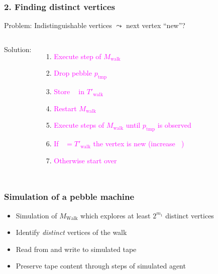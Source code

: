 \documentclass{beamer}
\DeclareMathOperator{\Tid}{T_{\text{id}}}
\DeclareMathOperator{\Twalk}{T_{\text{walk}}}
\begin{document}
\begin{frame}
  \frametitle{2. Finding distinct vertices}
  Problem: Indistinguishable vertices $\leadsto$ next vertex \enquote{new}?
  \begin{columns}
    Solution:
    \begin{enumerate}
      \item \textcolor<3,8>{magenta}{Execute step of $M_{\text{walk}}$}
      \item \textcolor<4,9>{magenta}{Drop pebble $p_{\text{tmp}}$}
      \item \textcolor<4,9>{magenta}{Store $\Twalk$ in $T'_{\text{walk}}$}
      \item \textcolor<5,10>{magenta}{Restart $M_{\text{walk}}$}
      \item \textcolor<6,11-18>{magenta}{Execute steps of $M_{\text{walk}}$
          until $p_{\text{tmp}}$ is observed}
      \item \textcolor<19-20>{magenta}{If $\Twalk = T'_{\text{walk}}$ the
          vertex is new (increase $\Tid$)}
      \item \textcolor<7>{magenta}{Otherwise start over}
    \end{enumerate}
    
  \end{columns}
\end{frame}



\begin{frame}
  \frametitle{Simulation of a pebble machine}
  \begin{itemize}
    \item Simulation of $M_{\text{Walk}}$ which explores at least $2^{m_{1}}$
      distinct vertices 
    \item Identify \emph{distinct} vertices of the walk
    \item Read from and write to simulated tape 
    \item Preserve tape content through steps of simulated agent
  \end{itemize}
\end{frame}
\end{document}
